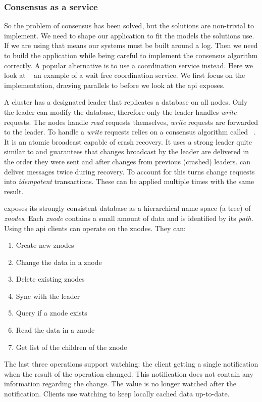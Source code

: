 \subsubsection*{Consensus as a service}
So the problem of consensus has been solved, but the solutions are non-trivial to implement. We need to shape our application to fit the models the solutions use. If we are using \raft{} that means our systems must be built around a log. Then we need to build the application while being careful to implement the consensus algorithm correctly. A popular alternative is to use a coordination service instead. Here we look at \zookeeper{}~\cite{zookeeper} an example of a wait free coordination service. We first focus on the implementation, drawing parallels to \raft{} before we look at the \ac{api} \zookeeper{} exposes.

A \zookeeper{} cluster has a designated leader that replicates a database on all nodes. Only the leader can modify the database, therefore only the leader handles \textit{write} requests. The nodes handle \textit{read} requests themselves, \textit{write} requests are forwarded to the leader. To handle a \textit{write} requests \zookeeper{} relies on a consensus algorithm called \zab{}~\cite{zab}. It is an atomic broadcast capable of crash recovery. It uses a strong leader quite similar to \raft{} and guarantees that changes broadcast by the leader are delivered in the order they were sent and after changes from previous (crashed) leaders. \zab{} can deliver messages twice during recovery. To account for this \zookeeper{} turns change requests into \textit{idempotent} transactions. These can be applied multiple times with the same result.

\zookeeper{} exposes its strongly consistent database as a hierarchical name space (a tree) of \textsl{znodes}. Each \textsl{znode} contains a small amount of data and is identified by its \textsl{path}. Using the \ac{api} clients can operate on the znodes. They can: 
%
\begin{multicols}{2}
\begin{enumerate}
	\item Create new znodes
	\item Change the data in a znode
	\item Delete existing znodes
	\item Sync with the leader
	\item Query if a znode exists
	\item Read the data in a znode
	\item Get list of the children of the znode
\end{enumerate}
\end{multicols}
%
The last three operations support watching: the client getting a single notification when the result of the operation changed. This notification does not contain any information regarding the change. The value is no longer watched after the notification. Clients use watching to keep locally cached data up-to-date. 

